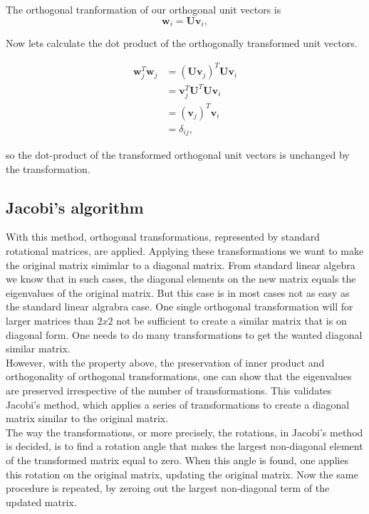 \documentclass{article}
\begin{document}
The orthogonal tranformation of our orthogonal unit vectors is
\[
\mathbf{w}_i=\mathbf{U}\mathbf{v}_i,
\]

Now lets calculate the dot product of the orthogonally transformed unit vectors.

\begin{subequations} 
	\begin{align}
	\mathbf{w}_j^T \mathbf{w}_j &= (\mathbf{U v}_j)^T \mathbf{U v}_i\\
	&= \mathbf{v}_j^T \mathbf{U}^T \mathbf{U} \mathbf{v}_i \\
	&= (\mathbf{v}_j)^T \mathbf{v}_i\\
	&= \delta_{ij},
	\end{align}
\end{subequations}

so the dot-product of the transformed orthogonal unit vectors is unchanged by the transformation.

\subsection{Jacobi's algorithm}
With this method, orthogonal transformations, represented by standard rotational matrices, are applied. Applying these transformations we want to make the original matrix simimlar to a diagonal matrix. From standard linear algebra we know that in such cases, the diagonal elements on the new matrix equals the eigenvalues of the original matrix. But this case is in most cases not as easy as the standard linear algrabra case. One single orthogonal transformation will for larger matrices than $2x2$ not be sufficient to create a similar matrix that is on diagonal form. One needs to do many transformations to get the wanted diagonal similar matrix.\\

However, with the property above, the preservation of inner product and orthogonality of orthogonal transformations, one can show that the eigenvalues are preserved irrespective of the number of transformations. This validates Jacobi's method, which applies a series of transformations to create a diagonal matrix similar to the original matrix.\\

The way the transformations, or more precisely, the rotations, in Jacobi's method is decided, is to find a rotation angle that makes the largest non-diagonal element of the transformed matrix equal to zero. When this angle is found, one applies this rotation on the original matrix, updating the original matrix. Now the same procedure is repeated, by zeroing out the largest non-diagonal term of the updated matrix.\\ 
\end{document}
